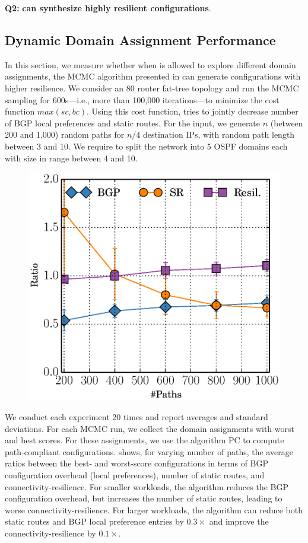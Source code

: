 \textbf{Q2:} 
\textbf{\name can synthesize highly resilient configurations}.


\subsection{Dynamic Domain Assignment Performance} \label{sec:mcmceval}

In this section, we measure whether
when \name  is allowed to explore different domain assignments,
the MCMC algorithm presented in 
can 
generate configurations
with higher resilience. 
We consider an 80 router fat-tree topology and run the MCMC sampling
for 600s---i.e., more than 100,000 iterations---to minimize the
 cost function $max(sc, bc)$. Using this cost function, \name
 tries to jointly decrease number of 
 BGP local preferences and static routes. 
 For the input, we generate $n$ (between
200 and 1,000) random paths for $n/4$ destination IPs, with random
path length between 3 and 10.  We require \name to split the network
into 5 OSPF domains each with size in range between 4 and 10.

\begin{figure}
\vspace{-5.5mm}
	\includegraphics[width=0.48\columnwidth]{figures/ratioMCMC.eps}
	\vspace{-3mm}
\end{figure}
We conduct each experiment 20 times and report averages and standard
deviations.  For each MCMC run, we collect the domain assignments with
worst and best scores.  For these assignments, we use the algorithm PC
to compute path-compliant configurations.
 shows, for varying number of paths, the average ratios
between the best- and worst-score configurations
in terms of
BGP configuration overhead (local preferences), 
number of static routes, and 
connectivity-resilience.
For smaller workloads, 
the algorithm reduces the BGP configuration overhead, but increases
the number of static routes, leading to worse connectivity-resilience. For 
larger workloads, the algorithm can
reduce both static routes 
and BGP local preference entries by $0.3\times$
and improve the connectivity-resilience 
by $0.1\times$.

